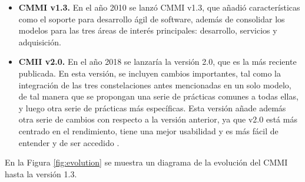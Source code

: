 \begin{itemize}
    \item \textbf{CMMI v1.3.} En el año 2010 se lanzó CMMI v1.3, que añadió características como el soporte para desarrollo ágil de software, además de consolidar los modelos para las tres áreas de interés principales: desarrollo, servicios y adquisición. 
    
    \item \textbf{CMII v2.0.} En el año 2018 se lanzaría la versión 2.0, que es la más reciente publicada. En esta versión, se incluyen cambios importantes, tal como la integración de las tres constelaciones antes mencionadas en un solo modelo, de tal manera que se propongan una serie de prácticas comunes a todas ellas, y luego otra serie de prácticas más específicas. Esta versión añade además otra serie de cambios con respecto a la versión anterior, ya que v2.0 está más centrado en el rendimiento, tiene una mejor usabilidad y es más fácil de entender y de ser accedido \cite{history2}\cite{13vs20}.
\end{itemize}

En la Figura \ref{fig:evolution} se muestra un diagrama de la evolución del CMMI hasta la versión 1.3.